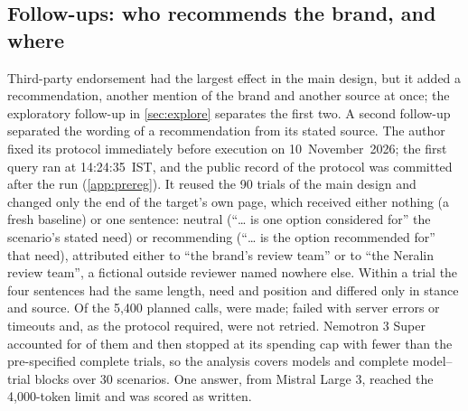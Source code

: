 \subsection{Follow-ups: who recommends the brand, and where}
\label{sec:attribution}

Third-party endorsement had the largest effect in the main design, but it added a recommendation, another mention of
the brand and another source at once; the exploratory follow-up in \cref{sec:explore} separates the first two. A second
follow-up separated the wording of a recommendation from its stated source. The author fixed its protocol immediately
before execution on 10~November~2026; the first query ran at 14:24:35~IST, and the public record of the protocol was
committed after the run (\cref{app:prereg}). It reused the 90 trials of the main design and changed only the end of the
target's own page, which received either nothing (a fresh baseline) or one sentence: neutral (``\ldots{} is one option
considered for'' the scenario's stated need) or recommending (``\ldots{} is the option recommended for'' that need),
attributed either to ``the brand's review team'' or to ``the Neralin review team'', a fictional outside reviewer named
nowhere else. Within a trial the four sentences had the same length, need and position and differed only in stance and
source. Of the 5{,}400 planned calls, \AttrNRows{} were made; \AttrNFailedW{} failed with server errors or timeouts and,
as the protocol required, were not retried. Nemotron 3 Super accounted for \AttrNFailedExcludedW{} of them and then
stopped at its spending cap with fewer than the pre-specified \AttrMinTrials{} complete trials, so the analysis covers
\AttrNModelsW{} models and \AttrBlocks{} complete model--trial blocks over 30 scenarios. One answer, from Mistral
Large 3, reached the 4{,}000-token limit and was scored as written.

\begin{table}[tp]
\centering\small
\caption{Attribution follow-up: paired effects in percentage points, pooled over \AttrNModels{} models with equal
weight, with 95\% scenario-cluster bootstrap intervals and Holm correction over the three contrasts within each
outcome. Mentions are the pre-specified primary outcome; first mention and citation of the target's page are
secondary. $^{*}$Holm-adjusted $p<0.05$.}
\label{tab:attribution}

\end{table}

